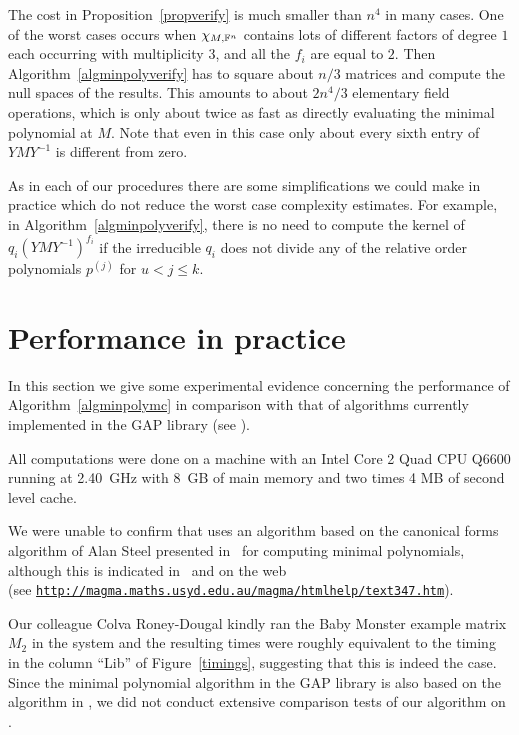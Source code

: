 \begin{Rem}
The cost in Proposition~\ref{propverify} is much smaller than $n^4$ in
many cases. One of the worst cases occurs when $\chi_{M,\mathbb{F}^n}$ contains lots of
different factors of degree $1$ each occurring with multiplicity $3$, and 
all the $f_i$ are equal to $2$. Then Algorithm~\ref{algminpolyverify} has to
square about $n/3$ matrices and compute the null spaces of the results. 
This amounts to about
$2n^4/3$ elementary field operations, which is only about twice as fast as 
directly evaluating the minimal polynomial at $M$. Note that even in this case
only about every sixth entry of\/ $YMY^{-1}$ is different from zero. 
\end{Rem}

\begin{Rem}
 As in each of our procedures there are some simplifications we
could make in practice which do not reduce the worst case complexity
estimates. For example, in Algorithm~\ref{algminpolyverify}, there is no
need to compute the kernel of $q_i(YMY^{-1})^{f_i}$ if the irreducible
$q_i$ does not divide any of the relative order polynomials $p^{(j)}$
for $u<j\leq k$.
\end{Rem}



\section{Performance in practice}
\label{performance}

In this section we give some experimental evidence concerning 
the performance of Algorithm~\ref{algminpolymc} in comparison with 
that of algorithms currently implemented in the
{\sf GAP} library (see \cite{GAP4}). 

All computations were done on a machine with an Intel Core 2 Quad CPU Q6600
running at 2.40~GHz with 8~GB of main memory and two times 4 MB of second level
cache. 

We were unable to confirm that {\MAGMA} \cite{Magma} 
uses an algorithm  based on the canonical forms algorithm of Alan
Steel presented in~\cite{Steel} for computing minimal 
polynomials, although this is indicated in~\cite[Abstract]{Steel} and on the
web\\ %
(see \href{http://magma.maths.usyd.edu.au/magma/htmlhelp/text347.htm}
{\texttt{http://magma.maths.usyd.edu.au/magma/htmlhelp/text347.htm}}).

Our colleague Colva Roney-Dougal kindly
ran the Baby Monster example matrix $M_2$ in the {\MAGMA} system and the resulting
times were roughly equivalent to the timing in the column ``Lib'' of
Figure~\ref{timings}, suggesting that this is indeed the case. Since the
minimal polynomial algorithm in the {\sf GAP} library is also based on 
the algorithm in \cite{Steel}, we did not conduct extensive comparison tests of our
algorithm on {\MAGMA}.

